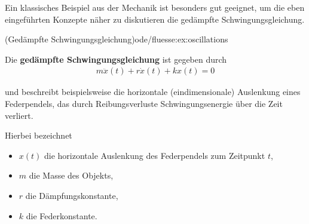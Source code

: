 \documentclass[letterpaper,10pt,german]{jupyterBook}
\begin{document}
\par
Ein klassisches Beispiel aus der Mechanik ist besonders gut geeignet, um die eben eingeführten Konzepte näher zu diskutieren   die gedämpfte Schwingungsgleichung.
\begin{example}{(Gedämpfte Schwingungsgleichung)}{ode/fluesse:ex:oscillations}



\par
Die \textbf{gedämpfte Schwingungsgleichung} ist gegeben durch
\begin{align}\label{equation:ode/fluesse:eq:schwingungsgleichung}
m\ddot{x}(t) + r\dot{x}(t) + kx(t)=0
\end{align}
\par
und beschreibt beispielsweise die horizontale (eindimensionale) Auslenkung eines Federpendels, das durch Reibungsverluste Schwingungsenergie über die Zeit verliert.

\par
Hierbei bezeichnet
\begin{itemize}
\item {} 
\par
\(x(t)\) die horizontale Auslenkung des Federpendels zum Zeitpunkt \(t\),

\item {} 
\par
\(m\) die Masse des Objekts,

\item {} 
\par
\(r\) die Dämpfungskonstante,

\item {} 
\par
\(k\) die Federkonstante.

\end{itemize}


\end{example}
\end{document}
